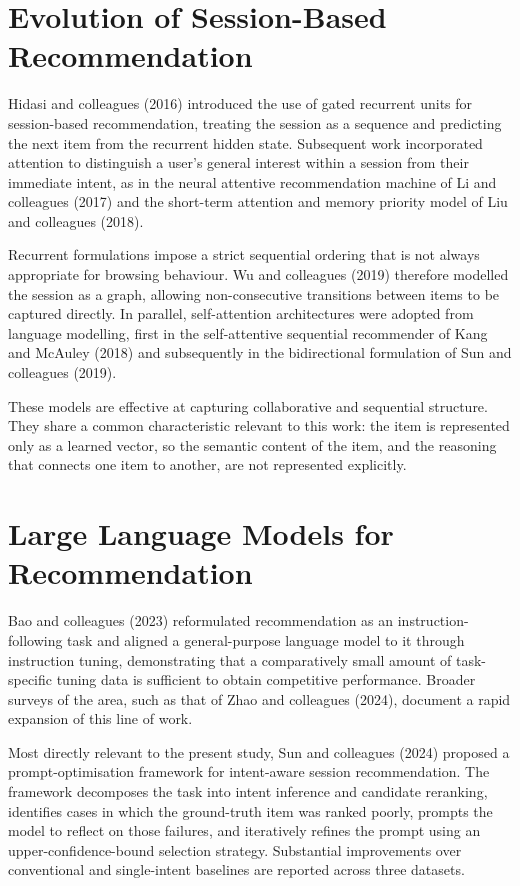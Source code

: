 \documentclass[12pt,a4paper,oneside]{report}
\begin{document}
\section{Evolution of Session-Based Recommendation}

Hidasi and colleagues (2016) introduced the use of gated recurrent units for
session-based recommendation, treating the session as a sequence and predicting
the next item from the recurrent hidden state. Subsequent work incorporated
attention to distinguish a user's general interest within a session from their
immediate intent, as in the neural attentive recommendation machine of Li and
colleagues (2017) and the short-term attention and memory priority model of Liu
and colleagues (2018).

Recurrent formulations impose a strict sequential ordering that is not always
appropriate for browsing behaviour. Wu and colleagues (2019) therefore modelled
the session as a graph, allowing non-consecutive transitions between items to be
captured directly. In parallel, self-attention architectures were adopted from
language modelling, first in the self-attentive sequential recommender of Kang
and McAuley (2018) and subsequently in the bidirectional formulation of Sun and
colleagues (2019).

These models are effective at capturing collaborative and sequential structure.
They share a common characteristic relevant to this work: the item is
represented only as a learned vector, so the semantic content of the item, and
the reasoning that connects one item to another, are not represented explicitly.

\section{Large Language Models for Recommendation}

Bao and colleagues (2023) reformulated recommendation as an instruction-following
task and aligned a general-purpose language model to it through instruction
tuning, demonstrating that a comparatively small amount of task-specific tuning
data is sufficient to obtain competitive performance. Broader surveys of the
area, such as that of Zhao and colleagues (2024), document a rapid expansion of
this line of work.

Most directly relevant to the present study, Sun and colleagues (2024) proposed
a prompt-optimisation framework for intent-aware session recommendation. The
framework decomposes the task into intent inference and candidate reranking,
identifies cases in which the ground-truth item was ranked poorly, prompts the
model to reflect on those failures, and iteratively refines the prompt using an
upper-confidence-bound selection strategy. Substantial improvements over
conventional and single-intent baselines are reported across three datasets.
\end{document}
